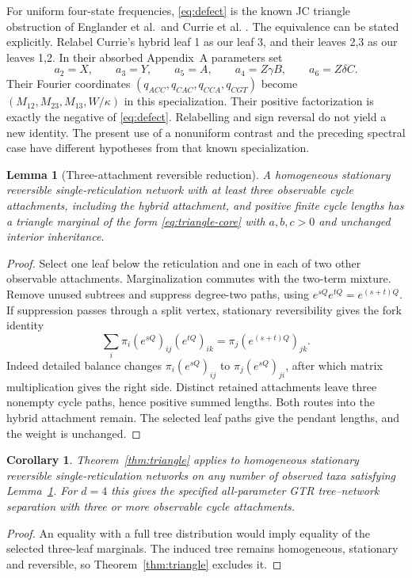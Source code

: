 \documentclass[11pt]{article}
\newtheorem{lemma}[theorem]{Lemma}
\newtheorem{corollary}[theorem]{Corollary}
\theoremstyle{definition}
\theoremstyle{remark}
\begin{document}
For uniform four-state frequencies, \eqref{eq:defect} is the known JC
triangle obstruction of Englander et al.\ and Currie et al.
\cite{Englander2025,Currie2026}. The equivalence can be stated explicitly.
Relabel Currie's hybrid leaf 1 as our leaf 3, and their leaves 2,3 as our
leaves 1,2. In their absorbed Appendix~A parameters set
\[
 a_2=X,\qquad a_3=Y,\qquad a_5=A,\qquad
 a_4=Z\gamma B,\qquad a_6=Z\delta C.
\]
Their Fourier coordinates $(q_{ACC},q_{CAC},q_{CCA},q_{CGT})$ become
$(M_{12},M_{23},M_{13},W/\kappa)$ in this specialization. Their positive
factorization is exactly the negative of \eqref{eq:defect}. Relabelling
and sign reversal do not yield a new identity. The present use of a
nonuniform contrast and the preceding spectral case have different
hypotheses from that known specialization.

\begin{lemma}[Three-attachment reversible reduction]
\label{lem:triangle-reduction}
A homogeneous stationary reversible single-reticulation network with at
least three observable cycle attachments, including the hybrid attachment,
and positive finite cycle lengths has a triangle marginal of the form
\eqref{eq:triangle-core} with $a,b,c>0$ and unchanged interior inheritance.
\end{lemma}
\begin{proof}
Select one leaf below the reticulation and one in each of two other
observable attachments. Marginalization commutes with the two-term
mixture. Remove unused subtrees and suppress degree-two paths, using
$e^{sQ}e^{tQ}=e^{(s+t)Q}$. If suppression passes through a split vertex,
stationary reversibility gives the fork identity
\begin{equation}\label{eq:fork}
 \sum_i\pi_i(e^{sQ})_{ij}(e^{tQ})_{ik}
       =\pi_j(e^{(s+t)Q})_{jk}.
\end{equation}
Indeed detailed balance changes
$\pi_i(e^{sQ})_{ij}$ to $\pi_j(e^{sQ})_{ji}$, after which matrix
multiplication gives the right side. Distinct retained attachments leave
three nonempty cycle paths, hence positive summed lengths. Both routes
into the hybrid attachment remain. The selected leaf paths give the
pendant lengths, and the weight is unchanged.
\end{proof}

\begin{corollary}\label{cor:reversible-large}
Theorem~\ref{thm:triangle} applies to homogeneous stationary reversible
single-reticulation networks on any number of observed taxa satisfying
Lemma~\ref{lem:triangle-reduction}. For $d=4$ this gives the specified
all-parameter GTR tree--network separation with three or more observable
cycle attachments.
\end{corollary}
\begin{proof}
An equality with a full tree distribution would imply equality of the
selected three-leaf marginals. The induced tree remains homogeneous,
stationary and reversible, so Theorem~\ref{thm:triangle} excludes it.
\end{proof}
\end{document}
